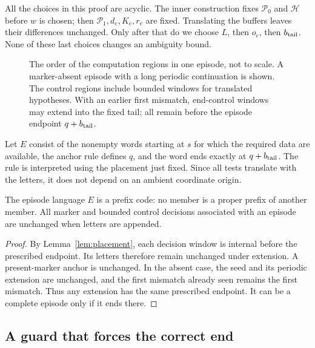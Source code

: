 All the choices in this proof are acyclic.  The inner construction fixes
$\mathcal P_0$ and $\mathcal H$ before $w$ is chosen; then
$\mathcal P_1,d_e,K_e,r_e$ are fixed.  Translating the buffers leaves
their differences unchanged.  Only after that do we choose $L$, then
$o_e$, then $b_{\rm tail}$.  None of these last choices changes an
ambiguity bound.

\begin{figure}[tbp]
 \centering
 
 \caption{The order of the computation regions in one episode, not to
 scale. A marker-absent episode with a long periodic continuation is shown.
 The control regions include bounded windows for translated hypotheses.
 With an earlier first mismatch, end-control windows may extend into the
 fixed tail; all remain before the episode endpoint $q+b_{\rm tail}$.}
 \label{fig:episode-schedule}
\end{figure}

\begin{definition}
Let $E$ consist of the nonempty words starting at $s$ for which the
required data are available, the anchor rule defines $q$, and the word
ends exactly at $q+b_{\rm tail}$.  The rule is interpreted using the
placement just fixed.  Since all tests translate with the letters, it
does not depend on an ambient coordinate origin.
\end{definition}

\begin{lemma}
\label{lem:prefix-code}
The episode language $E$ is a prefix code: no member is a proper prefix
of another member.  All marker and bounded control decisions associated
with an episode are unchanged when letters are appended.
\end{lemma}

\begin{proof}
By Lemma~\ref{lem:placement}, each decision window is internal before
the prescribed endpoint.  Its letters therefore remain unchanged under
extension.  A present-marker anchor is unchanged.  In the absent case,
the seed and its periodic extension are unchanged, and the first mismatch
already seen remains the first mismatch.  Thus any extension has the same
prescribed endpoint.  It can be a complete episode only if it ends there.
\end{proof}

\subsection{A guard that forces the correct end}

